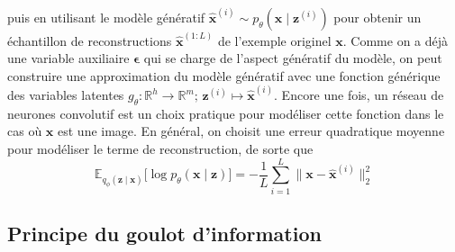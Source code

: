 puis en utilisant le modèle génératif $\hat{\mathbf{x}}^{(i)} \sim p_\theta(\mathbf{x} \mid \mathbf{z}^{(i)})$ pour obtenir 
un échantillon de reconstructions $\mathbf{\hat{x}}^{(1:L)}$ de l'exemple originel $\mathbf{\mathbf{x}}$. 
Comme on a déjà une variable auxiliaire $\boldsymbol{ \epsilon} $ 
qui se charge de l'aspect génératif du modèle, on peut construire une approximation du 
modèle génératif avec une fonction générique des variables latentes 
${g_\theta: \mathbb{R}^{h} \rightarrow \mathbb{R}^{m};\, \mathbf{z}^{(i)} \mapsto \hat{\mathbf{x}}^{(i)}}$.
Encore une fois, un réseau de neurones convolutif est un choix pratique pour modéliser cette fonction 
dans le cas où $\mathbf{x}$ est une image. En général, on choisit une erreur quadratique moyenne pour modéliser le terme de reconstruction, 
de sorte que
\begin{equation}\label{eq:reconstruction}
        \mathbb{E}_{q_\phi(\mathbf{z} \mid \mathbf{x})} \bigg[
                \log p_\theta(\mathbf{x} \mid \mathbf{z})
        \bigg] 
        = -\frac{1}{L}\sum_{i=1}^{L} \lVert \mathbf{x} - \hat{\mathbf{x}}^{(i)} \rVert_2^{2}
\end{equation} 

\subsection{Principe du goulot d'information}


